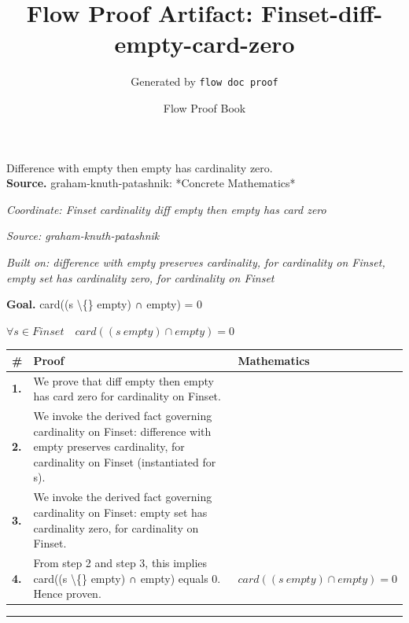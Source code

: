 \documentclass[11pt]{article}
\title{Flow Proof Artifact: Finset-diff-empty-card-zero}
\author{Generated by \texttt{flow doc proof}}
\date{Flow Proof Book}
\theoremstyle{definition}
\begin{document}
\maketitle
Difference with empty then empty has cardinality zero.\\[0.5em]
\textbf{Source.} graham-knuth-patashnik: *Concrete Mathematics*\\[0.5em]
\bigskip
{}\par
\smallskip\noindent\textit{Coordinate: Finset \cdot cardinality \cdot diff empty then empty has card zero}\par
\smallskip\noindent\textit{Source: graham-knuth-patashnik}\par
\smallskip\noindent\textit{Built on: difference with empty preserves cardinality, for cardinality on Finset, empty set has cardinality zero, for cardinality on Finset}\par
\medskip
\noindent\textbf{Goal.} card((s \textbackslash\{\} empty) ∩ empty) = 0\par
\noindent$\displaystyle \forall s \in Finset\quad card((s \ empty) ∩ empty) = 0$\par
\medskip
\noindent
\begin{tabular}{@{} >{\raggedright\arraybackslash}p{} >{\raggedright\arraybackslash}p{} >{\raggedleft\arraybackslash}p{} @{}}
\textbf{\#} & \textbf{Proof} & \textbf{Mathematics} \\
\midrule
\textbf{1.} & We prove that diff empty then empty has card zero for cardinality on Finset. & \\[0.45em]
\textbf{2.} & We invoke the derived fact governing cardinality on Finset: difference with empty preserves cardinality, for cardinality on Finset (instantiated for s). & \\[0.45em]
\textbf{3.} & We invoke the derived fact governing cardinality on Finset: empty set has cardinality zero, for cardinality on Finset. & \\[0.45em]
\textbf{4.} & From step 2 and step 3, this implies card((s \textbackslash\{\} empty) ∩ empty) equals 0. Hence proven. & $\displaystyle card((s \ empty) ∩ empty) = 0$ \\[0.45em]
\bottomrule
\end{tabular}
\label{thm:Finset-cardinality-diff_empty_then_empty_has_card_zero}
\par\medskip\hrule
\end{document}
